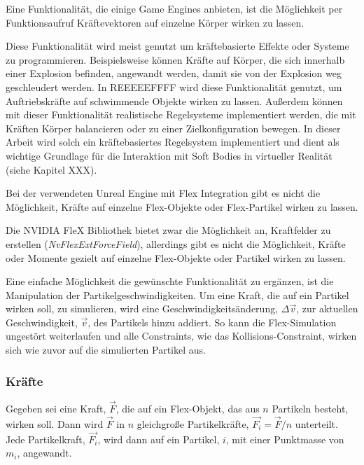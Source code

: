Eine Funktionalität, die einige Game Engines anbieten, ist die Möglichkeit per Funktionsaufruf Kräftevektoren auf einzelne Körper wirken zu lassen. 

Diese Funktionalität wird meist genutzt um kräftebasierte Effekte oder Systeme zu programmieren. Beispielsweise können Kräfte auf Körper, die sich innerhalb einer Explosion befinden, angewandt werden, damit sie von der Explosion weg geschleudert werden. In REEEEEFFFF wird diese Funktionalität genutzt, um Auftriebskräfte auf schwimmende Objekte wirken zu lassen. 
Außerdem können mit dieser Funktionalität realistische Regelsysteme implementiert werden, die mit Kräften Körper balancieren oder zu einer Zielkonfiguration bewegen. In dieser Arbeit wird solch ein kräftebasiertes Regelsystem implementiert und dient als wichtige Grundlage für die Interaktion mit Soft Bodies in virtueller Realität (siehe Kapitel XXX).

Bei der verwendeten Unreal Engine mit Flex Integration gibt es nicht die Möglichkeit, Kräfte auf einzelne Flex-Objekte oder Flex-Partikel wirken zu lassen.

Die NVIDIA FleX Bibliothek bietet zwar die Möglichkeit an, Kraftfelder zu erstellen (\textit{NvFlexExtForceField}), allerdings gibt es nicht die Möglichkeit, Kräfte oder Momente gezielt auf einzelne Flex-Objekte oder Partikel wirken zu lassen. %

Eine einfache Möglichkeit die gewünschte Funktionalität zu ergänzen, ist die Manipulation der Partikelgeschwindigkeiten. Um eine Kraft, die auf ein Partikel wirken soll, zu simulieren, wird eine Geschwindigkeitsänderung, $\Delta\vec{v}$, zur aktuellen Geschwindigkeit, $\vec{v}$, des Partikels hinzu addiert. So kann die Flex-Simulation ungestört weiterlaufen und alle Constraints, wie das Kollisions-Constraint, wirken sich wie zuvor auf die simulierten Partikel aus.

\subsubsection{Kräfte}
Gegeben sei eine Kraft, $\vec{F}$, die auf ein Flex-Objekt, das aus $n$ Partikeln besteht, wirken soll. Dann wird $\vec{F}$ in $n$ gleichgroße Partikelkräfte, $\vec{F_i} = \vec{F} / n$ unterteilt. Jede Partikelkraft, $\vec{F_i}$, wird dann auf ein Partikel, $i$, mit einer Punktmasse von $m_i$, angewandt.

